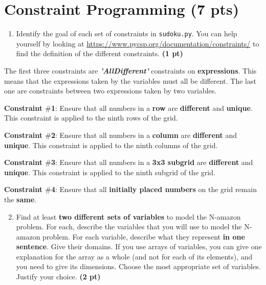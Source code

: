 \documentclass[11pt,a4paper]{report}
\begin{document}
\maketitle

\section{Constraint Programming (7 pts)}

\begin{enumerate}
\item Identify the goal of each set of constraints in \texttt{sudoku.py}. You can help yourself by looking 
at \url{https://www.pycsp.org/documentation/constraints/} to find the definition of the different constraints. \textbf{(1 pt)}
\end{enumerate}

\begin{answers}[4cm]

\footnotesize{The first three constraints are \textbf{\textit{'AllDifferent'}} constraints on \textbf{expressions}. This means that the expressions taken by the variables must all be different. The last one are constraints between two expressions taken by two variables.

\textbf{Constraint $\#$1}: Ensure that all numbers in a \textbf{row} are \textbf{different} and \textbf{unique}. This constraint is applied to the ninth rows of the grid.

\textbf{Constraint $\#$2}: Ensure that all numbers in a \textbf{column} are \textbf{different} and \textbf{unique}. This constraint is applied to the ninth columns of the grid.

\textbf{Constraint $\#$3}: Ensure that all numbers in a \textbf{3x3 subgrid} are \textbf{different} and \textbf{unique}. This constraint is applied to the ninth subgrid of the grid.

\textbf{Constraint $\#$4}: Ensure that all \textbf{initially placed numbers} on the grid remain the \textbf{same}.}

\end{answers}



\begin{enumerate}
	\setcounter{enumi}{1}
	\item Find at least \textbf{two different sets of variables} to model the N-amazon problem.
	For each, describe the variables that you will use to model the N-amazon problem. 
	For each variable, describe what they represent \textbf{in one sentence}. Give their domains.
	If you use arrays of variables, you can give one explanation for the array as a whole (and not for each of its elements), 
	and you need to give its dimensions.
	Choose the most appropriate set of variables. Justify your choice. \textbf{(2 pt)}

\end{enumerate}
\end{document}
